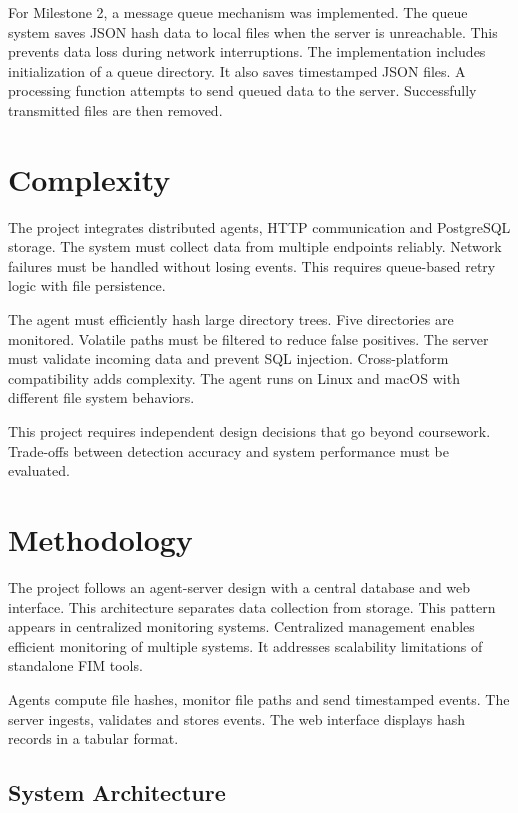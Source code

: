 \documentclass[conference]{IEEEtran}
\begin{document}
For Milestone 2, a message queue mechanism was implemented. The queue system saves JSON hash data to local files when the server is unreachable. This prevents data loss during network interruptions. The implementation includes initialization of a queue directory. It also saves timestamped JSON files. A processing function attempts to send queued data to the server. Successfully transmitted files are then removed.

\section{Complexity}

The project integrates distributed agents, HTTP communication and PostgreSQL storage. The system must collect data from multiple endpoints reliably. Network failures must be handled without losing events. This requires queue-based retry logic with file persistence.

The agent must efficiently hash large directory trees. Five directories are monitored. Volatile paths must be filtered to reduce false positives. The server must validate incoming data and prevent SQL injection. Cross-platform compatibility adds complexity. The agent runs on Linux and macOS with different file system behaviors.

This project requires independent design decisions that go beyond coursework. Trade-offs between detection accuracy and system performance must be evaluated.

\section{Methodology}

The project follows an agent-server design with a central database and web interface. This architecture separates data collection from storage. This pattern appears in centralized monitoring systems. Centralized management enables efficient monitoring of multiple systems. It addresses scalability limitations of standalone FIM tools.

Agents compute file hashes, monitor file paths and send timestamped events. The server ingests, validates and stores events. The web interface displays hash records in a tabular format.

\subsection{System Architecture}
\end{document}
